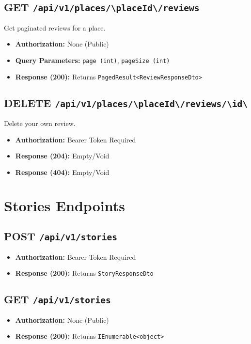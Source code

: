 \subsection{GET \texttt{/api/v1/places/\textbackslash{}{placeId\textbackslash{}}/reviews}}
Get paginated reviews for a place.
\begin{itemize}
    \item \textbf{Authorization:} None (Public)
    \item \textbf{Query Parameters:} \texttt{page (int)}, \texttt{pageSize (int)}
    \item \textbf{Response (200):} Returns \texttt{PagedResult<ReviewResponseDto>}
\end{itemize}

\subsection{DELETE \texttt{/api/v1/places/\textbackslash{}{placeId\textbackslash{}}/reviews/\textbackslash{}{id\textbackslash{}}}}
Delete your own review.
\begin{itemize}
    \item \textbf{Authorization:} Bearer Token Required
    \item \textbf{Response (204):} Empty/Void
    \item \textbf{Response (404):} Empty/Void
\end{itemize}

\section{Stories Endpoints}

\subsection{POST \texttt{/api/v1/stories}}
\begin{itemize}
    \item \textbf{Authorization:} Bearer Token Required
    \item \textbf{Response (200):} Returns \texttt{StoryResponseDto}
\end{itemize}

\subsection{GET \texttt{/api/v1/stories}}
\begin{itemize}
    \item \textbf{Authorization:} None (Public)
    \item \textbf{Response (200):} Returns \texttt{IEnumerable<object>}
\end{itemize}

